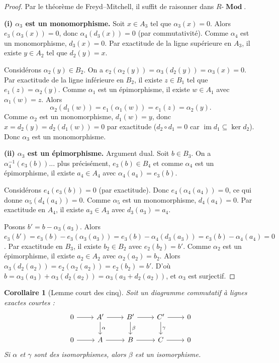 \documentclass[a4paper,12pt]{book}
\DeclareMathOperator{\im}{im}
\DeclareMathOperator{\Mod}{\mathbf{Mod}}
\newtheorem{corollaire}[theoreme]{Corollaire}
\begin{document}
\begin{proof}
Par le théorème de Freyd--Mitchell, il suffit de raisonner dans
$R\text{-}\Mod$.

\medskip
\textbf{(i) $\alpha_3$ est un monomorphisme.}
Soit $x \in A_3$ tel que $\alpha_3(x) = 0$. Alors
$e_3(\alpha_3(x)) = 0$, donc $\alpha_4(d_3(x)) = 0$
(par commutativité). Comme $\alpha_4$ est un monomorphisme,
$d_3(x) = 0$. Par exactitude de la ligne supérieure en $A_3$,
il existe $y \in A_2$ tel que $d_2(y) = x$.

Considérons $\alpha_2(y) \in B_2$. On a
$e_2(\alpha_2(y)) = \alpha_3(d_2(y)) = \alpha_3(x) = 0$.
Par exactitude de la ligne inférieure en $B_2$, il existe
$z \in B_1$ tel que $e_1(z) = \alpha_2(y)$.
Comme $\alpha_1$ est un épimorphisme, il existe $w \in A_1$
avec $\alpha_1(w) = z$. Alors
\[
  \alpha_2(d_1(w)) = e_1(\alpha_1(w)) = e_1(z) = \alpha_2(y).
\]
Comme $\alpha_2$ est un monomorphisme, $d_1(w) = y$, donc
$x = d_2(y) = d_2(d_1(w)) = 0$ par exactitude ($d_2 \circ d_1 = 0$
car $\im d_1 \subseteq \ker d_2$). Donc $\alpha_3$ est un monomorphisme.

\medskip
\textbf{(ii) $\alpha_3$ est un épimorphisme.}
Argument dual. Soit $b \in B_3$. On a
$\alpha_4^{-1}(e_3(b))$... plus précisément, $e_3(b) \in B_4$
et comme $\alpha_4$ est un épimorphisme, il existe $a_4 \in A_4$
avec $\alpha_4(a_4) = e_3(b)$.

Considérons $e_4(e_3(b)) = 0$ (par exactitude). Donc
$e_4(\alpha_4(a_4)) = 0$, ce qui donne $\alpha_5(d_4(a_4)) = 0$.
Comme $\alpha_5$ est un monomorphisme, $d_4(a_4) = 0$.
Par exactitude en $A_4$, il existe $a_3 \in A_3$ avec $d_3(a_3) = a_4$.

Posons $b' = b - \alpha_3(a_3)$. Alors
$e_3(b') = e_3(b) - e_3(\alpha_3(a_3)) = e_3(b) - \alpha_4(d_3(a_3))
= e_3(b) - \alpha_4(a_4) = 0$.
Par exactitude en $B_3$, il existe $b_2 \in B_2$ avec $e_2(b_2) = b'$.
Comme $\alpha_2$ est un épimorphisme, il existe $a_2 \in A_2$ avec
$\alpha_2(a_2) = b_2$. Alors
$\alpha_3(d_2(a_2)) = e_2(\alpha_2(a_2)) = e_2(b_2) = b'$.
D'où $b = \alpha_3(a_3) + \alpha_3(d_2(a_2)) = \alpha_3(a_3 + d_2(a_2))$,
et $\alpha_3$ est surjectif.
\end{proof}

\begin{corollaire}[Lemme court des cinq]\label{cor:short-five}
Soit un diagramme commutatif à lignes exactes courtes :
\[
\begin{tikzcd}
0 \arrow[r] & A' \arrow[r] \arrow[d, "\alpha"] & B' \arrow[r] \arrow[d, "\beta"]
  & C' \arrow[r] \arrow[d, "\gamma"] & 0 \\
0 \arrow[r] & A \arrow[r] & B \arrow[r] & C \arrow[r] & 0
\end{tikzcd}
\]
Si $\alpha$ et $\gamma$ sont des isomorphismes, alors $\beta$ est un
isomorphisme.
\end{corollaire}
\end{document}
